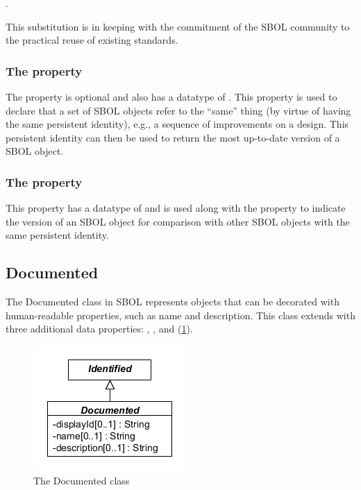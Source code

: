 .

This substitution is in keeping with the commitment of the SBOL community to the practical reuse of existing standards.

\subsubsection*{The  property}
\label{sec:persistentIdentity}
The  property is optional and also has a datatype of . This property is used to declare that a set of SBOL objects refer to the ``same'' thing (by virtue of having the same persistent identity), e.g., a sequence of improvements on a design. This persistent identity can then be used to return the most up-to-date version of a SBOL object.



\subsubsection*{The  property}
\label{sec:version}
This property has a datatype of  and is used along with the  property to indicate the version of an SBOL object for comparison with other SBOL objects with the same persistent identity.

\subsection {Documented}
\label{sec:Documented}
The Documented class in SBOL represents objects that can be decorated with human-readable properties, such as name and description. This class extends  with three additional data properties: , , and  (\ref{uml:documented}). 

\begin{figure}[ht]
\begin{center}
\includegraphics[scale=0.6]{uml/documented}
\caption[]{The Documented class}
\label{uml:documented}
\end{center}
\end{figure}

